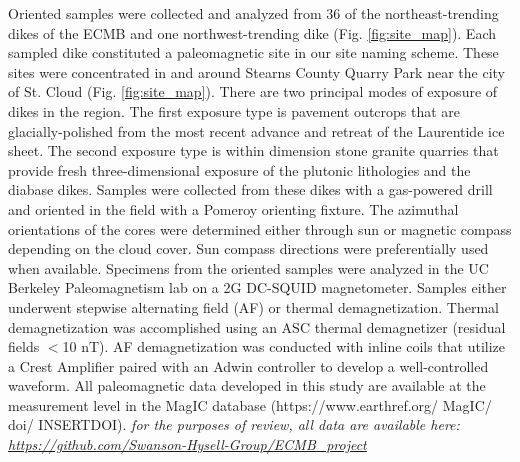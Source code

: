 \documentclass[draft]{agujournal2019}
\begin{document}
Oriented samples were collected and analyzed from 36 of the northeast-trending dikes of the ECMB and one northwest-trending dike (Fig. \ref{fig:site_map}). Each sampled dike constituted a paleomagnetic site in our site naming scheme. These sites were concentrated in and around Stearns County Quarry Park near the city of St. Cloud (Fig. \ref{fig:site_map}). There are two principal modes of exposure of dikes in the region. The first exposure type is pavement outcrops that are glacially-polished from the most recent advance and retreat of the Laurentide ice sheet. The second exposure type is within dimension stone granite quarries that provide fresh three-dimensional exposure of the plutonic lithologies and the diabase dikes. Samples were collected from these dikes with a gas-powered drill and oriented in the field with a Pomeroy orienting fixture. The azimuthal orientations of the cores were determined either through sun or magnetic compass depending on the cloud cover. Sun compass directions were preferentially used when available. Specimens from the oriented samples were analyzed in the UC Berkeley Paleomagnetism lab on a 2G DC-SQUID magnetometer. Samples either underwent stepwise alternating field (AF) or thermal demagnetization. Thermal demagnetization was accomplished using an ASC thermal demagnetizer (residual fields $<$10 nT). AF demagnetization was conducted with inline coils that utilize a Crest Amplifier paired with an Adwin controller to develop a well-controlled waveform. All paleomagnetic data developed in this study are available at the measurement level in the MagIC database (https://www.earthref.org/ MagIC/ doi/ INSERTDOI). \textit{for the purposes of review, all data are available here: \url{https://github.com/Swanson-Hysell-Group/ECMB_project}}
\end{document}
